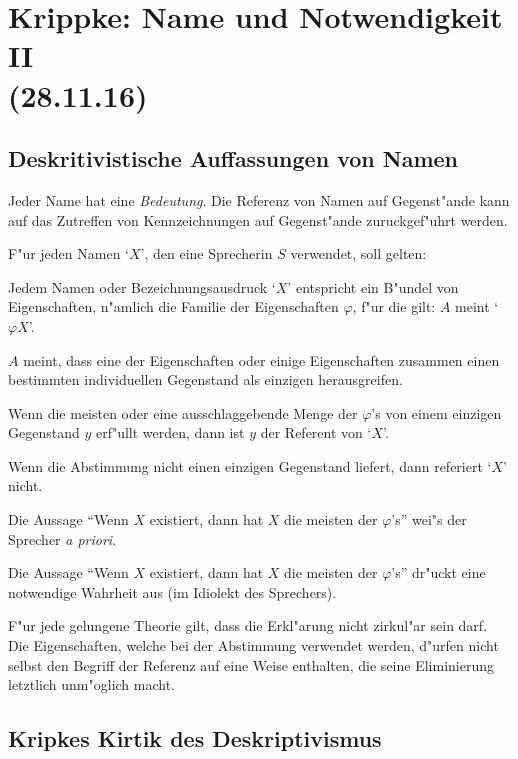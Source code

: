 \documentclass[emulatestandardclasses]{scrartcl}
\begin{document}
\section{Krippke: Name und Notwendigkeit II\\(28.11.16)}

\subsection{Deskritivistische Auffassungen von Namen}  

Jeder Name hat eine \emph{Bedeutung}. Die Referenz von Namen auf Gegenst"ande kann auf das Zutreffen von Kennzeichnungen auf Gegenst"ande zuruckgef"uhrt werden.

F"ur jeden Namen `$X$', den eine Sprecherin $S$ verwendet, soll gelten:

\begin{description}[leftmargin=!,labelwidth=\widthof{\bfseries (B)}]
    \item[(1)] Jedem Namen oder Bezeichnungsausdruck `$X$' entspricht ein B"undel von Eigenschaften, n"amlich die Familie der Eigenschaften $\varphi$, f"ur die gilt: $A$ meint `$\varphi X$'.
    \item[(2)] $A$ meint, dass eine der Eigenschaften oder einige Eigenschaften zusammen einen bestimmten individuellen Gegenstand als einzigen herausgreifen.
    \item[(3)] Wenn die meisten oder eine ausschlaggebende Menge der $\varphi$'s von einem einzigen Gegenstand $y$ erf"ullt werden, dann ist $y$ der Referent von `$X$'.
    \item[(4)] Wenn die Abstimmung nicht einen einzigen Gegenstand liefert, dann referiert `$X$' nicht.
    \item[(5)] Die Aussage "`Wenn $X$ existiert, dann hat $X$ die meisten der $\varphi$'s"' wei"s der Sprecher \emph{a priori}.
    \item[(6)] Die Aussage "`Wenn $X$ existiert, dann hat $X$ die meisten der $\varphi$'s"' dr"uckt eine notwendige Wahrheit aus (im Idiolekt des Sprechers).
    \item[(B)] F"ur jede gelungene Theorie gilt, dass die Erkl"arung nicht zirkul"ar sein darf. Die Eigenschaften, welche bei der Abstimmung verwendet werden, d"urfen nicht selbst den Begriff der Referenz auf eine Weise enthalten, die seine Eliminierung letztlich unm"oglich macht.
\end{description}

\subsection{Kripkes Kirtik des Deskriptivismus}
\end{document}
